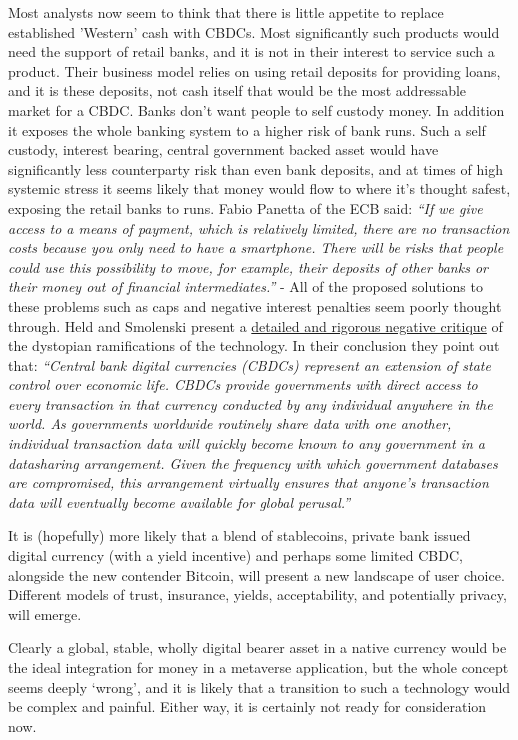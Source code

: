 Most analysts now seem to think that there is little appetite to replace established 'Western' cash with CBDCs. Most significantly such products would need the support of retail banks, and it is not in their interest to service such a product. Their business model relies on using retail deposits for providing loans, and it is these deposits, not cash itself that would be the most addressable market for a CBDC. Banks don't want people to self custody money. In addition it exposes the whole banking system to a higher risk of bank runs. Such a self custody, interest bearing, central government backed asset would have significantly less counterparty risk than even bank deposits, and at times of high systemic stress it seems likely that money would flow to where it's thought safest, exposing the retail banks to runs. Fabio Panetta of the ECB said: \textit{``If we give access to a means of payment, which is relatively limited, there are no transaction costs because you only need to have a smartphone. There will be risks that people could use this possibility to move, for example, their deposits of other banks or their money out of financial intermediates.''} - All of the proposed solutions to these problems such as caps and negative interest penalties seem poorly thought through.
Held and Smolenski present a \href{https://www.btcpolicy.org/articles/why-the-u-s-should-reject-central-bank-digital-currencies}{detailed and rigorous negative critique} of the dystopian ramifications of the technology. In their conclusion they point out that: \textit{``Central bank digital currencies (CBDCs) represent an extension of state control over economic life. CBDCs provide governments with direct access to every transaction in that currency conducted by any individual anywhere in the world. As governments worldwide routinely share data with one another, individual transaction data will quickly become known to any government in a datasharing arrangement. Given the frequency with which government databases are compromised, this arrangement virtually ensures that anyone’s transaction data will eventually become available for global perusal.''}\par
It is (hopefully) more likely that a blend of stablecoins, private bank issued digital currency (with a yield incentive) and perhaps some limited CBDC, alongside the new contender Bitcoin, will present a new landscape of user choice. Different models of trust, insurance, yields, acceptability, and potentially privacy, will emerge. \par
Clearly a global, stable, wholly digital bearer asset in a native currency would be the ideal integration for money in a metaverse application, but the whole concept seems deeply `wrong', and it is likely that a transition to such a technology would be complex and painful. Either way, it is certainly not ready for consideration now.
